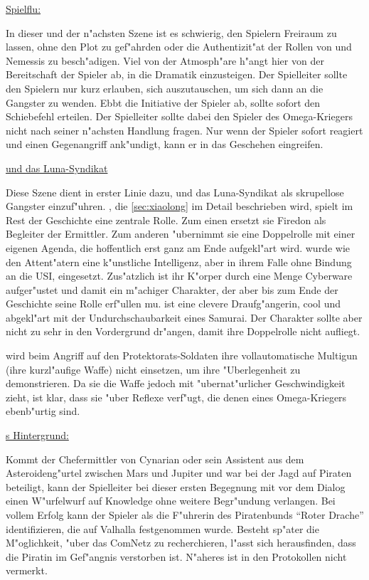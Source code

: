 \vfill

\begin{remarks}
	\underline{Spielflu\3:}

	In dieser und der n"achsten Szene ist es schwierig, den Spielern Freiraum zu lassen, ohne den Plot zu gef"ahrden oder die Authentizit"at der Rollen von \xl{} und Nemessis zu besch"adigen. Viel von der Atmosph"are h"angt hier von der Bereitschaft der Spieler ab, in die Dramatik einzusteigen. Der Spielleiter sollte den Spielern nur kurz erlauben, sich auszutauschen, um sich dann an die Gangster zu wenden. Ebbt die Initiative der Spieler ab, sollte \xl{} sofort den Schie\3befehl erteilen. Der Spielleiter sollte dabei den Spieler des Omega-Kriegers nicht nach seiner n"achsten Handlung fragen. Nur wenn der Spieler sofort reagiert und einen Gegenangriff ank"undigt, kann er in das Geschehen eingreifen.

	\underline{\xl{} und das Luna-Syndikat}

	Diese Szene dient in erster Linie dazu, \xl{} und das Luna-Syndikat als skrupellose Gangster einzuf"uhren. \xl{}, die  \cref{sec:xiaolong} im Detail beschrieben wird, spielt im Rest der Geschichte eine zentrale Rolle. Zum einen ersetzt sie Firedon als Begleiter der Ermittler. Zum anderen "ubernimmt sie eine Doppelrolle mit einer eigenen Agenda, die hoffentlich erst ganz am Ende aufgekl"art wird. \xl{} wurde wie den Attent"atern eine k"unstliche Intelligenz, aber in ihrem Falle ohne Bindung an die USI, eingesetzt. Zus"atzlich ist ihr K"orper durch eine Menge Cyberware aufger"ustet und damit ein m"achiger Charakter, der aber bis zum Ende der Geschichte seine Rolle erf"ullen mu\3. \xl{} ist eine clevere Draufg"angerin, cool und abgekl"art mit der Undurchschaubarkeit
	eines Samurai. Der Charakter sollte aber nicht zu sehr in den Vordergrund dr"angen, damit ihre Doppelrolle nicht aufliegt.

	\xl{} wird beim Angriff auf den Protektorats-Soldaten ihre vollautomatische Multigun (ihre kurzl"aufige Waffe) nicht einsetzen, um ihre "Uberlegenheit zu demonstrieren. Da sie die Waffe jedoch mit "ubernat"urlicher Geschwindigkeit zieht, ist klar, dass sie "uber Reflexe verf"ugt, die denen eines Omega-Kriegers ebenb"urtig sind.

	\underline{\xl{}s Hintergrund:}

	Kommt der Chefermittler von Cynarian oder sein Assistent aus dem Asteroideng"urtel zwischen Mars und Jupiter und war bei der Jagd auf Piraten beteiligt, kann der Spielleiter bei dieser ersten Begegnung mit \xl{} vor dem Dialog einen W"urfelwurf auf Knowledge ohne weitere Begr"undung verlangen. Bei vollem Erfolg kann der Spieler \xl{} als die F"uhrerin des Piratenbunds ``Roter Drache'' identifizieren, die auf Valhalla festgenommen wurde. Besteht sp"ater die M"oglichkeit, "uber das ComNetz zu recherchieren, l"asst sich herausfinden, dass die Piratin im Gef"angnis verstorben ist. N"aheres ist in den Protokollen nicht vermerkt.
\end{remarks}


